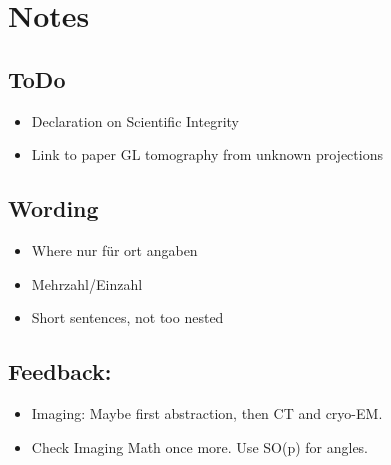 \chapter{Notes}

\section{ToDo}
\begin{itemize}
    \item Declaration on Scientific Integrity
    \item Link to paper GL tomography from unknown projections
\end{itemize}


\section{Wording}
\begin{itemize}
    \item Where nur für ort angaben
    \item Mehrzahl/Einzahl
    \item Short sentences, not too nested
\end{itemize}

\section{Feedback:}
\begin{itemize}
    \item Imaging: Maybe first abstraction, then CT and cryo-EM.
    \item Check Imaging Math once more. Use SO(p) for angles.
\end{itemize}


\clearpage
